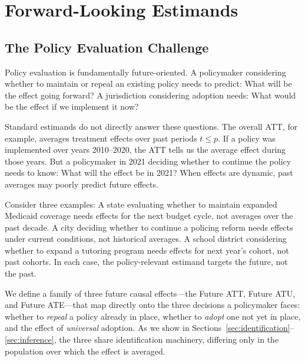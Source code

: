 \documentclass{article}
\begin{document}
\section{Forward-Looking Estimands}
\label{sec:estimands}


\subsection{The Policy Evaluation Challenge}


Policy evaluation is fundamentally future-oriented. A policymaker considering whether to maintain or repeal an existing policy needs to predict: What will be the effect going forward? A jurisdiction considering adoption needs: What would be the effect if we implement it now?

Standard estimands do not directly answer these questions. The overall ATT, for example, averages treatment effects over past periods $t \leq p$. If a policy was implemented over years 2010--2020, the ATT tells us the average effect during those years. But a policymaker in 2021 deciding whether to continue the policy needs to know: What will the effect be in 2021? When effects are dynamic, past averages may poorly predict future effects.

Consider three examples: A state evaluating whether to maintain expanded Medicaid coverage needs effects for the next budget cycle, not averages over the past decade. A city deciding whether to continue a policing reform needs effects under current conditions, not historical averages. A school district considering whether to expand a tutoring program needs effects for next year's cohort, not past cohorts. In each case, the policy-relevant estimand targets the future, not the past.

We define a family of three future causal effects---the Future ATT, Future ATU, and Future ATE---that map directly onto the three decisions a policymaker faces: whether to \emph{repeal} a policy already in place, whether to \emph{adopt} one not yet in place, and the effect of \emph{universal} adoption. As we show in Sections~\ref{sec:identification}--\ref{sec:inference}, the three share identification machinery, differing only in the population over which the effect is averaged.
\end{document}
